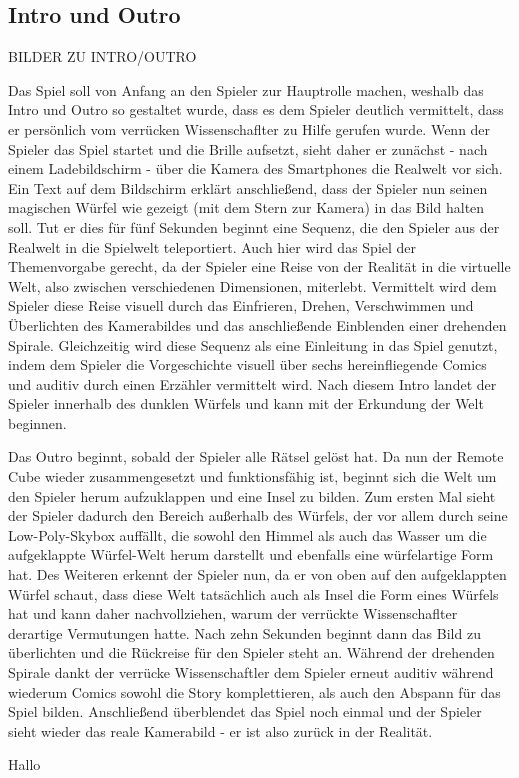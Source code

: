 \subsection{Intro und Outro}

BILDER ZU INTRO/OUTRO

Das Spiel soll von Anfang an den Spieler zur Hauptrolle machen, weshalb das Intro und Outro so gestaltet wurde, dass es dem Spieler deutlich vermittelt, dass er persönlich vom verrücken Wissenschaflter zu Hilfe gerufen wurde. Wenn der Spieler das Spiel startet und die Brille aufsetzt, sieht daher er zunächst - nach einem Ladebildschirm - über die Kamera des Smartphones die Realwelt vor sich. Ein Text auf dem Bildschirm erklärt anschließend, dass der Spieler nun seinen magischen Würfel wie gezeigt (mit dem Stern zur Kamera) in das Bild halten soll. Tut er dies für fünf Sekunden beginnt eine Sequenz, die den Spieler aus der Realwelt in die Spielwelt teleportiert. Auch hier wird das Spiel der Themenvorgabe gerecht, da der Spieler eine Reise von der Realität in die virtuelle Welt, also zwischen verschiedenen Dimensionen, miterlebt. Vermittelt wird dem Spieler diese Reise visuell durch das Einfrieren, Drehen, Verschwimmen und Überlichten des Kamerabildes und das anschließende Einblenden einer drehenden Spirale. Gleichzeitig wird diese Sequenz als eine Einleitung in das Spiel genutzt, indem dem Spieler die Vorgeschichte visuell über sechs hereinfliegende Comics und auditiv durch einen Erzähler vermittelt wird. Nach diesem Intro landet der Spieler innerhalb des dunklen Würfels und kann mit der Erkundung der Welt beginnen.

Das Outro beginnt, sobald der Spieler alle Rätsel gelöst hat. Da nun der Remote Cube wieder zusammengesetzt und funktionsfähig ist, beginnt sich die Welt um den Spieler herum aufzuklappen und eine Insel zu bilden. Zum ersten Mal sieht der Spieler dadurch den Bereich außerhalb des Würfels, der vor allem durch seine Low-Poly-Skybox auffällt, die sowohl den Himmel als auch das Wasser um die aufgeklappte Würfel-Welt herum darstellt und ebenfalls eine würfelartige Form hat. Des Weiteren erkennt der Spieler nun, da er von oben auf den aufgeklappten Würfel schaut, dass diese Welt tatsächlich auch als Insel die Form eines Würfels hat und kann daher nachvollziehen, warum der verrückte Wissenschaflter derartige Vermutungen hatte. Nach zehn Sekunden beginnt dann das Bild zu überlichten und die Rückreise für den Spieler steht an. Während der drehenden Spirale dankt der verrücke Wissenschaftler dem Spieler erneut auditiv während wiederum Comics sowohl die Story komplettieren, als auch den Abspann für das Spiel bilden. Anschließend überblendet das Spiel noch einmal und der Spieler sieht wieder das reale Kamerabild - er ist also zurück in der Realität.



Hallo